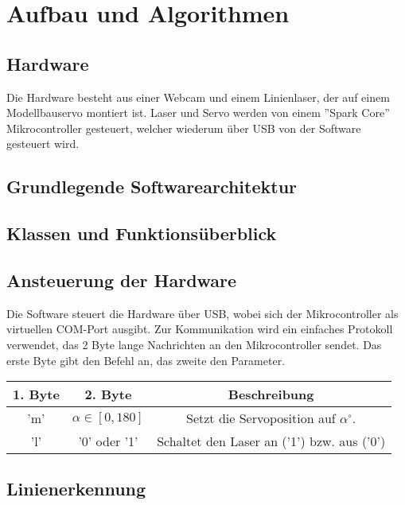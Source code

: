 \documentclass[ngerman,a4paper]{scrartcl}
\begin{document}

\section{Aufbau und Algorithmen}

\subsection{Hardware}

Die Hardware besteht aus einer Webcam und einem Linienlaser, der auf einem Modellbauservo montiert ist. Laser und Servo werden von einem ''Spark Core'' Mikrocontroller gesteuert, welcher wiederum über USB von der Software gesteuert wird.

\subsection{Grundlegende Softwarearchitektur}

\subsection{Klassen und Funktionsüberblick}

\subsection{Ansteuerung der Hardware}

Die Software steuert die Hardware über USB, wobei sich der Mikrocontroller als virtuellen COM-Port ausgibt. Zur Kommunikation wird ein einfaches Protokoll verwendet, das 2 Byte lange Nachrichten an den Mikrocontroller sendet. Das erste Byte gibt den Befehl an, das zweite den Parameter.\\

\begin{tabular}{|c|c|c|}
\hline
1. Byte & 2. Byte & Beschreibung \\
\hline
'm'\footnotemark & $\alpha \in [0,180]$ & Setzt die Servoposition auf $\alpha ^\circ$.\\
\hline
'l' & '0' oder '1' & Schaltet den Laser an ('1') bzw. aus ('0')\\
\hline
\end{tabular}



\subsection{Linienerkennung}
\end{document}
